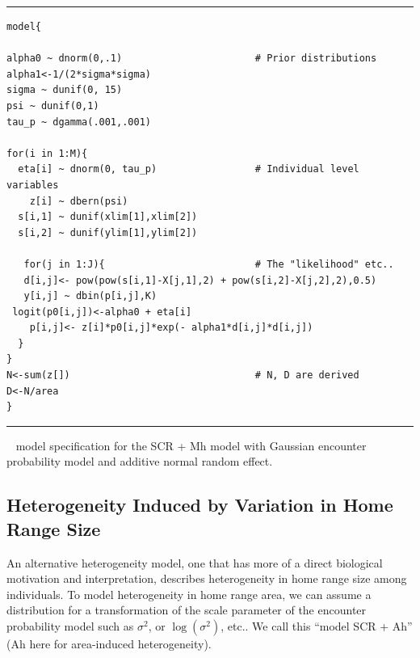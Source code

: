 \begin{panel}[htp]
\centering
\rule[0.1in]{\textwidth}{.03in}
{\small
\begin{verbatim}
model{

alpha0 ~ dnorm(0,.1)                       # Prior distributions
alpha1<-1/(2*sigma*sigma)
sigma ~ dunif(0, 15)
psi ~ dunif(0,1)
tau_p ~ dgamma(.001,.001)

for(i in 1:M){
  eta[i] ~ dnorm(0, tau_p)                 # Individual level variables
    z[i] ~ dbern(psi)
  s[i,1] ~ dunif(xlim[1],xlim[2])
  s[i,2] ~ dunif(ylim[1],ylim[2])

   for(j in 1:J){                          # The "likelihood" etc..
   d[i,j]<- pow(pow(s[i,1]-X[j,1],2) + pow(s[i,2]-X[j,2],2),0.5)
   y[i,j] ~ dbin(p[i,j],K)
 logit(p0[i,j])<-alpha0 + eta[i]
    p[i,j]<- z[i]*p0[i,j]*exp(- alpha1*d[i,j]*d[i,j])
  }
}
N<-sum(z[])                                # N, D are derived
D<-N/area
}

\end{verbatim}
}

\rule[-0.1in]{\textwidth}{.03in}
\caption{
\jags~ model specification for the SCR + Mh model with Gaussian
encounter 
probability model and additive normal random effect.
}
\label{covariates.panel.SCRMhjags}
\end{panel}




\subsection{Heterogeneity Induced by Variation in Home Range Size} 
\label{covariates.sec.heterogeneityHR}

An alternative heterogeneity model, one that has more of a direct
biological motivation and interpretation, describes heterogeneity in
home range size among individuals.
To model heterogeneity in home range
area, we can  assume a distribution for
a transformation of the scale
parameter of the encounter  probability model such as $\sigma^{2}$, or
$\log(\sigma^2)$, etc..
We call this 
``model SCR + Ah'' (Ah here for area-induced heterogeneity).

